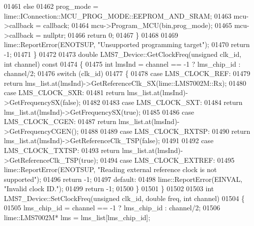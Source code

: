 \begin{DoxyCode}
{{{01461         \textcolor{keywordflow}{else}
01462             prog\_mode = lime::IConnection::MCU\_PROG\_MODE::EEPROM\_AND\_SRAM;
01463         mcu->callback = callback;
01464         mcu->Program_MCU(bin,prog\_mode);
01465         mcu->callback = \textcolor{keyword}{nullptr};
01466         \textcolor{keywordflow}{return} 0;
01467     \}
01468 
01469     lime::ReportError(ENOTSUP, \textcolor{stringliteral}{"Unsupported programming target"});
01470     \textcolor{keywordflow}{return} -1;
01471 \}
01472 
01473 \textcolor{keywordtype}{double} LMS7_Device::GetClockFreq(\textcolor{keywordtype}{unsigned} clk_id, \textcolor{keywordtype}{int} channel)\textcolor{keyword}{ const}
01474 \textcolor{keyword}{}\{
01475     \textcolor{keywordtype}{int} lmsInd = channel == -1 ? lms_chip_id : channel/2;
01476     \textcolor{keywordflow}{switch} (clk\_id)
01477     \{
01478     \textcolor{keywordflow}{case} LMS_CLOCK_REF:
01479         \textcolor{keywordflow}{return} lms_list.at(lmsInd)->GetReferenceClk\_SX(lime::LMS7002M::Rx);
01480     \textcolor{keywordflow}{case} LMS_CLOCK_SXR:
01481         \textcolor{keywordflow}{return} lms_list.at(lmsInd)->GetFrequencySX(\textcolor{keyword}{false});
01482 
01483     \textcolor{keywordflow}{case} LMS_CLOCK_SXT:
01484         \textcolor{keywordflow}{return} lms_list.at(lmsInd)->GetFrequencySX(\textcolor{keyword}{true});
01485 
01486     \textcolor{keywordflow}{case} LMS_CLOCK_CGEN:
01487         \textcolor{keywordflow}{return} lms_list.at(lmsInd)->GetFrequencyCGEN();
01488 
01489     \textcolor{keywordflow}{case} LMS_CLOCK_RXTSP:
01490         \textcolor{keywordflow}{return} lms_list.at(lmsInd)->GetReferenceClk\_TSP(\textcolor{keyword}{false});
01491 
01492     \textcolor{keywordflow}{case} LMS_CLOCK_TXTSP:
01493         \textcolor{keywordflow}{return} lms_list.at(lmsInd)->GetReferenceClk\_TSP(\textcolor{keyword}{true});
01494     \textcolor{keywordflow}{case} LMS_CLOCK_EXTREF:
01495         lime::ReportError(ENOTSUP, \textcolor{stringliteral}{"Reading external reference clock is not supported"});
01496         \textcolor{keywordflow}{return} -1;
01497     \textcolor{keywordflow}{default}:
01498         lime::ReportError(EINVAL, \textcolor{stringliteral}{"Invalid clock ID."});
01499         \textcolor{keywordflow}{return} -1;
01500     \}
01501 \}
01502 
01503 \textcolor{keywordtype}{int} LMS7_Device::SetClockFreq(\textcolor{keywordtype}{unsigned} clk_id, \textcolor{keywordtype}{double} freq, \textcolor{keywordtype}{int} channel)
01504 \{
01505     lms_chip_id = channel == -1 ? lms_chip_id : channel/2;
01506     lime::LMS7002M* lms = lms_list[lms_chip_id];
}}}
\end{DoxyCode}
